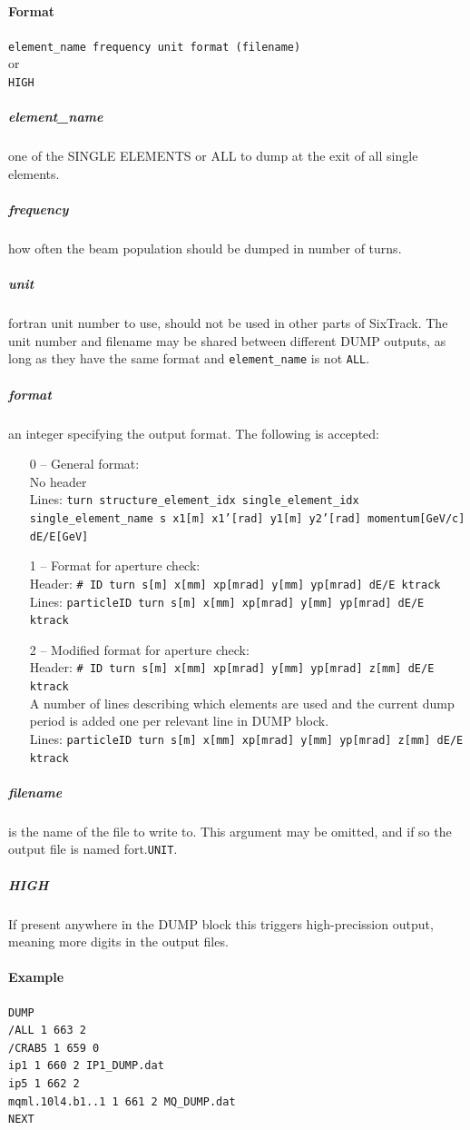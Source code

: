 \documentclass[a4paper,11pt]{report}
\begin{document}
\paragraph{Format}
\texttt{element\_name frequency unit format (filename)}\\
or\\
\texttt{HIGH}
\subparagraph{element\_name}
one of the SINGLE ELEMENTS or ALL to dump at the exit of all single elements.
\subparagraph{frequency}
how often the beam population should be dumped in number of turns.
\subparagraph{unit}
fortran unit number to use, should not be used in other parts of SixTrack.
The unit number and filename may be shared between different DUMP outputs, as long as they have the same format and \texttt{element\_name} is not \texttt{ALL}.
\subparagraph{format}
an integer specifying the output format. The following is accepted:
\begin{enumerate}
\item[0] -- General format:\\
  No header\\
  Lines: \texttt{turn structure\_element\_idx single\_element\_idx single\_element\_name s x1[m] x1'[rad] y1[m] y2'[rad] momentum[GeV/c] dE/E[GeV]}
\item[1] -- Format for aperture check:\\
  Header: \texttt{\# ID turn s[m] x[mm] xp[mrad] y[mm] yp[mrad] dE/E ktrack}\\
  Lines: \texttt{particleID turn s[m] x[mm] xp[mrad] y[mm] yp[mrad] dE/E ktrack}
\item[2] -- Modified format for aperture check:\\  
  Header: \texttt{\# ID turn s[m] x[mm] xp[mrad] y[mm] yp[mrad] z[mm] dE/E ktrack}\\
  A number of lines describing which elements are used and the current dump period is added one per relevant line in DUMP block.\\
  Lines: \texttt{particleID turn s[m] x[mm] xp[mrad] y[mm] yp[mrad] z[mm] dE/E ktrack}
\end{enumerate}

\subparagraph{filename} is the name of the file to write to. This argument may be omitted, and if so the output file is named fort.\texttt{UNIT}.

\subparagraph{HIGH} If present anywhere in the DUMP block this triggers high-precission output, meaning more digits in the output files.

\paragraph{Example}
\begin{verbatim}
DUMP
/ALL 1 663 2
/CRAB5 1 659 0
ip1 1 660 2 IP1_DUMP.dat
ip5 1 662 2
mqml.10l4.b1..1 1 661 2 MQ_DUMP.dat
NEXT
\end{verbatim}
\end{document}
